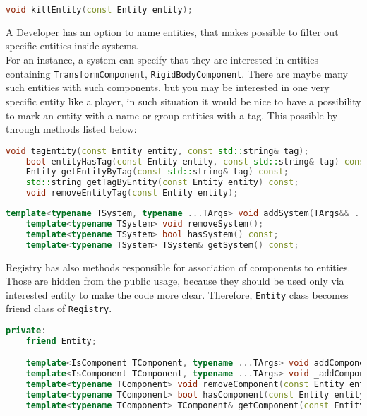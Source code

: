 \begin{lstlisting}[language=c++, caption=Removing of an entity (./engine/include/tsengine/ecs/ecs.h)]
void killEntity(const Entity entity);
\end{lstlisting}

A Developer has an option to name entities, that makes possible to filter out specific entities inside systems.\\
For an instance, a system can specify that they are interested in entities containing \texttt{TransformComponent}, \texttt{RigidBodyComponent}. There are maybe many such entities with such components, but you may be interested in one very specific entity like a player, in such situation it would be nice to have a possibility to mark an entity with a name or group entities with a tag. This possible by through methods listed below:   
\begin{lstlisting}[language=c++, caption=Registry tag and group methods (./engine/include/tsengine/ecs/ecs.h)]
    void tagEntity(const Entity entity, const std::string& tag);
    bool entityHasTag(const Entity entity, const std::string& tag) const;
    Entity getEntityByTag(const std::string& tag) const;
    std::string getTagByEntity(const Entity entity) const;
    void removeEntityTag(const Entity entity);
\end{lstlisting}

\begin{lstlisting}[language=c++, caption=Registry system methods (./engine/include/tsengine/ecs/ecs.h)]
    template<typename TSystem, typename ...TArgs> void addSystem(TArgs&& ...args);
    template<typename TSystem> void removeSystem();
    template<typename TSystem> bool hasSystem() const;
    template<typename TSystem> TSystem& getSystem() const;
\end{lstlisting}

Registry has also methods responsible for association of components to entities.
Those are hidden from the public usage, because they should be used only via interested entity to make the code more clear. Therefore, \texttt{Entity} class becomes friend class of \texttt{Registry}. 
\begin{lstlisting}[language=c++, caption=Registry component addition methods (./engine/include/tsengine/ecs/ecs.h)]
private:
    friend Entity;

    template<IsComponent TComponent, typename ...TArgs> void addComponent(const Entity entity, TArgs&& ...args);
    template<IsComponent TComponent, typename ...TArgs> void _addComponent(const Entity entity, TArgs&& ...args);
    template<typename TComponent> void removeComponent(const Entity entity);
    template<typename TComponent> bool hasComponent(const Entity entity) const;
    template<typename TComponent> TComponent& getComponent(const Entity entity) const;
\end{lstlisting}

